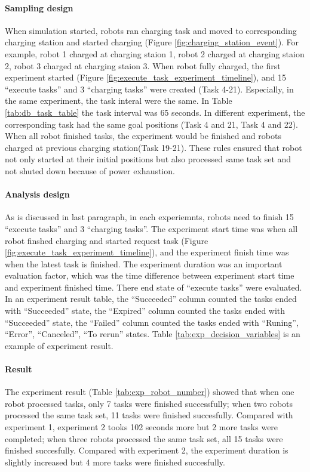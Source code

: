 \paragraph{Sampling design}
When simulation started, robots ran charging task and moved to corresponding charging station and started charging (Figure \ref{fig:charging_station_event}). For example, robot 1 charged at charging staion 1, robot 2 charged at charging staion 2, robot 3 charged at charging staion 3. 
When robot fully charged, the first experiment started (Figure \ref{fig:execute_task_experiment_timeline}), and 15 ``execute tasks'' and 3 ``charging tasks'' were created (Task 4-21). Especially, in the same experiment, the task interal were the same. In Table \ref{tab:db_task_table} the task interval was 65 seconds. In different experiment, the corresponding task had the same goal positions (Task 4 and 21, Task 4 and 22). 
When all robot finished tasks, the experiment would be finished and robots charged at previous charging station(Task 19-21).
These rules ensured that robot not only started at their initial positions but also processed same task set and not shuted down because of power exhaustion.


\paragraph{Analysis design}
As is discussed in last paragraph, in each experiemnts, robots need to finish 15 ``execute tasks'' and 3 ``charging tasks''.
The experiment start time was when all robot finshed charging and started request task (Figure \ref{fig:execute_task_experiment_timeline}), and the experiment finish time was when the latest task is finished.
The experiment duration was an important evaluation factor, which was the time difference between experiment start time and experiment finished time.  
There end state of ``execute tasks'' were evaluated. In an experiment result table, the ``Succeeded'' column counted the tasks ended with ``Succeeded'' state, the ``Expired'' column counted the tasks ended with ``Succeeded'' state, the ``Failed'' column counted the tasks ended with ``Runing'', ``Error'', ``Canceled'', ``To rerun'' states. 
Table \ref{tab:exp_decision_variables} is an example of experiment result. 

\paragraph{Result} The experiment result (Table \ref{tab:exp_robot_number}) showed that when one robot processed tasks, only 7 tasks were finished successfully; when two robots processed the same task set, 11 tasks were finished succesfully. Compared with experiment 1, experiment 2 tooks 102 seconds more but 2 more tasks were completed; when three robots processed the same task set, all 15 tasks were finished succesfully. Compared with experiment 2, the experiment duration is slightly increased but 4 more tasks were finished succesfully.

